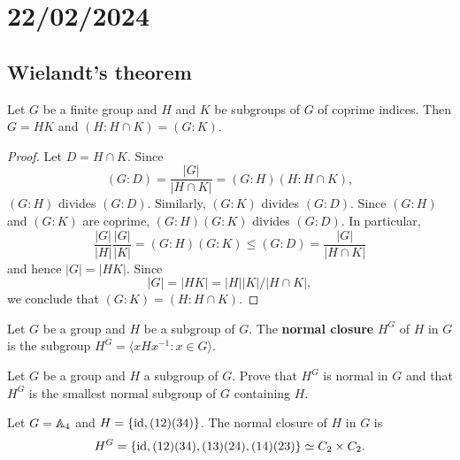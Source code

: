 \section{22/02/2024}

\subsection{Wielandt's theorem}

\begin{lemma}
	\label{lemma:4Wielandt}
	Let $G$ be a finite group and $H$ and $K$ be subgroups of $G$ 
        of coprime indices. Then $G=HK$ and $(H:H\cap K)=(G:K)$.
\end{lemma}

\begin{proof}
	Let $D=H\cap K$. Since 
	\[
	(G:D)=\frac{|G|}{|H\cap K|}=(G:H)(H:H\cap K),
	\]
	$(G:H)$ divides $(G:D)$. Similarly, $(G:K)$ divides 
	$(G:D)$. Since $(G:H)$ and $(G:K)$ are coprime, $(G:H)(G:K)$
	divides $(G:D)$. In particular, 
	\[
	\frac{|G|}{|H|}\frac{|G|}{|K|}=(G:H)(G:K)\leq (G:D)=\frac{|G|}{|H\cap K|} 
	\]
	and hence $|G|=|HK|$. Since 
 \[
 |G|=|HK|=|H||K|/|H\cap K|,
 \]
 we conclude that 
	$(G:K)=(H:H\cap K)$.
\end{proof}

\begin{definition}
Let $G$ be a group and $H$ be a subgroup of $G$. The 
\textbf{normal closure} $H^G$ of $H$ in $G$ is the subgroup 
$H^G=\langle xHx^{-1}:x\in G\rangle$.
\end{definition}

\begin{exercise}
Let $G$ be a group and $H$ a subgroup of $G$. Prove that $H^G$ is normal in $G$ and that 
$H^G$ is the smallest normal subgroup of $G$ containing $H$. 
\end{exercise}


\begin{example}
Let $G=\mathbb{A}_4$ and $H=\{\operatorname{id},(12)(34)\}$. The normal closure of $H$ in $G$
is 
 \[
 H^G=\{\operatorname{id},(12)(34),(13)(24),(14)(23)\}\simeq C_2\times C_2.
 \]
\end{example}

